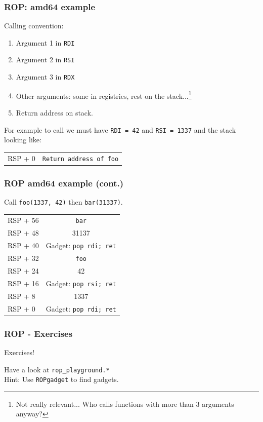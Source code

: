 \documentclass{beamer}
\begin{document}
\begin{frame}
    \frametitle{ROP: amd64 example}
    Calling convention:
    \begin{enumerate}
        \item Argument 1 in \texttt{RDI}
        \item Argument 2 in \texttt{RSI}
        \item Argument 3 in \texttt{RDX}
        \item Other arguments: some in registries, rest on the stack...\footnote{Not really relevant... Who calls functions with more than 3 arguments anyway?}
        \item Return address on stack.
    \end{enumerate}
    \pause For example to call 
    \pause we must have \texttt{RDI = 42}
    \pause and \texttt{RSI = 1337}
    \pause and the stack looking like:
    \begin{center}
    \begin{tabular}{l|c}
        RSP + 0  & \texttt{Return address of foo}
    \end{tabular}
    \end{center}
\end{frame}


\begin{frame}
    \frametitle{ROP amd64 example (cont.)}
    Call \texttt{foo(1337, 42)} then \texttt{bar(31337)}.
    \begin{center}
    \begin{tabular}{l|c}
        RSP + 56 & \texttt{bar} \\
        RSP + 48 & 31137 \\
        RSP + 40 & Gadget: \texttt{pop rdi; ret} \\
        RSP + 32 & \texttt{foo} \\
        RSP + 24 & 42 \\
        RSP + 16 & Gadget: \texttt{pop rsi; ret} \\
        RSP + 8  & 1337 \\
        RSP + 0  & Gadget: \texttt{pop rdi; ret} \\
    \end{tabular}
    \end{center}
\end{frame}


\begin{frame}
    \frametitle{ROP - Exercises}
    \begin{center}
        {\Huge Exercises!}
    \end{center}
    Have a look at \texttt{rop\_playground.*} \\
    Hint: Use \texttt{ROPgadget} to find gadgets.
\end{frame}
\end{document}
